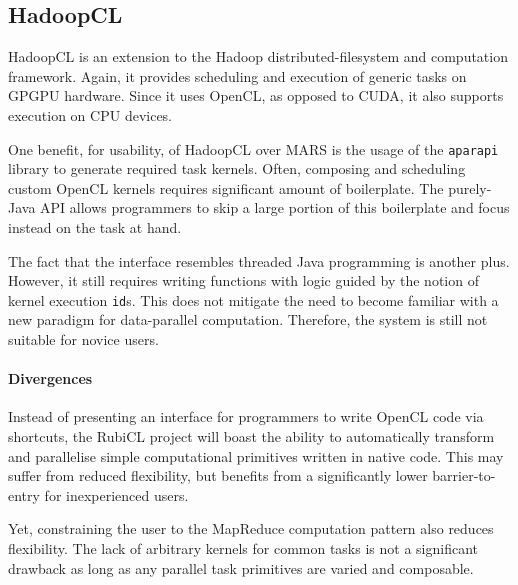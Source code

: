 \subsection{HadoopCL}
HadoopCL\cite{hadoopcl} is an extension to the Hadoop\cite{hadoop} distributed-filesystem and computation framework. Again, it provides scheduling and execution of generic tasks on  \ac{GPGPU} hardware. Since it uses \ac{OpenCL}, as opposed to \ac{CUDA}, it also supports execution on \ac{CPU} devices.

One benefit, for usability, of HadoopCL over MARS is the usage of the \verb|aparapi| library\cite{aparapi} to generate required task kernels. Often,  composing and scheduling custom \ac{OpenCL} kernels requires significant amount of boilerplate. The purely-Java \ac{API} allows programmers to skip a large portion of this boilerplate and focus instead on the task at hand.

The fact that the interface resembles threaded Java programming is another plus. However, it still requires writing functions with logic guided by the notion of kernel execution \verb|id|s. This does not mitigate the need to become familiar with a new paradigm for data-parallel computation. Therefore, the system is still not suitable for novice users.

\paragraph{Divergences}
Instead of presenting an interface for programmers to write \ac{OpenCL} code via shortcuts, the RubiCL project will boast the ability to automatically transform and parallelise simple computational primitives written in native code. This may suffer from reduced flexibility, but benefits from a significantly lower barrier-to-entry for inexperienced users.

Yet, constraining the user to the MapReduce computation pattern also reduces flexibility. The lack of arbitrary kernels for common tasks is not a significant drawback as long as any parallel task primitives are varied and composable.



